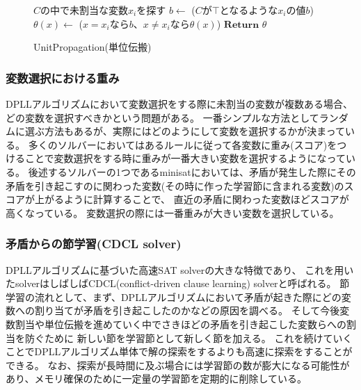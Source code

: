 \documentclass[titlepage]{jsarticle}
\begin{document}
\begin{figure}[!t]
\begin{algorithm}[H]
	\begin{algorithmic}[1]
				\State $C$の中で未割当な変数$x_i$を探す
				\State $b \gets$ ($C$が$\top$となるような$x_i$の値$b$)
				\State $\theta (x) \gets$ ($x=x_i$なら$b$、$x \neq x_i$なら$\theta (x)$)
			\EndWhile
			\State $\mathbf{Return}$ $\theta$ 
		\EndFunction
	\end{algorithmic}
\end{algorithm}
\caption{UnitPropagation(単位伝搬)}
\end{figure}





\subsubsection{変数選択における重み}
DPLLアルゴリズムにおいて変数選択をする際に未割当の変数が複数ある場合、どの変数を選択すべきかという問題がある。
一番シンプルな方法としてランダムに選ぶ方法もあるが、実際にはどのようにして変数を選択するかが決まっている。
多くのソルバーにおいてはあるルールに従って各変数に重み(スコア)をつけることで変数選択をする時に重みが一番大きい変数を選択するようになっている。
後述するソルバーの1つであるminisatにおいては、矛盾が発生した際にその矛盾を引き起こすのに関わった変数(その時に作った学習節に含まれる変数)のスコアが上がるように計算することで、
直近の矛盾に関わった変数ほどスコアが高くなっている。
変数選択の際には一番重みが大きい変数を選択している。



\subsubsection{矛盾からの節学習(CDCL solver)}
DPLLアルゴリズムに基づいた高速SAT solverの大きな特徴であり、
これを用いたsolverはしばしばCDCL(conflict-driven clause learning) solverと呼ばれる。
節学習の流れとして、まず、DPLLアルゴリズムにおいて矛盾が起きた際にどの変数への割り当てが矛盾を引き起こしたのかなどの原因を調べる。
そして今後変数割当や単位伝搬を進めていく中でさきほどの矛盾を引き起こした変数らへの割当を防ぐために
新しい節を学習節として新しく節を加える。
これを続けていくことでDPLLアルゴリズム単体で解の探索をするよりも高速に探索をすることができる。
なお、探索が長時間に及ぶ場合には学習節の数が膨大になる可能性があり、メモリ確保のために一定量の学習節を定期的に削除している。
\end{document}
